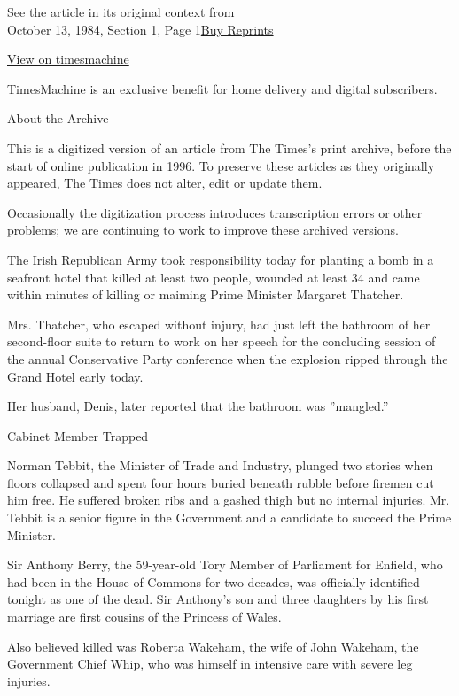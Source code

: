 See the article in its original context from\\
October 13, 1984, Section 1, Page
1\href{https://store.nytimes.com/collections/new-york-times-page-reprints?utm_source=nytimes\&utm_medium=article-page\&utm_campaign=reprints}{Buy
Reprints}

\href{http://timesmachine.nytimes.com/timesmachine/1984/10/13/008333.html}{View
on timesmachine}

TimesMachine is an exclusive benefit for home delivery and digital
subscribers.

About the Archive

This is a digitized version of an article from The Times's print
archive, before the start of online publication in 1996. To preserve
these articles as they originally appeared, The Times does not alter,
edit or update them.

Occasionally the digitization process introduces transcription errors or
other problems; we are continuing to work to improve these archived
versions.

The Irish Republican Army took responsibility today for planting a bomb
in a seafront hotel that killed at least two people, wounded at least 34
and came within minutes of killing or maiming Prime Minister Margaret
Thatcher.

Mrs. Thatcher, who escaped without injury, had just left the bathroom of
her second-floor suite to return to work on her speech for the
concluding session of the annual Conservative Party conference when the
explosion ripped through the Grand Hotel early today.

Her husband, Denis, later reported that the bathroom was ''mangled.''

Cabinet Member Trapped

Norman Tebbit, the Minister of Trade and Industry, plunged two stories
when floors collapsed and spent four hours buried beneath rubble before
firemen cut him free. He suffered broken ribs and a gashed thigh but no
internal injuries. Mr. Tebbit is a senior figure in the Government and a
candidate to succeed the Prime Minister.

Sir Anthony Berry, the 59-year-old Tory Member of Parliament for
Enfield, who had been in the House of Commons for two decades, was
officially identified tonight as one of the dead. Sir Anthony's son and
three daughters by his first marriage are first cousins of the Princess
of Wales.

Also believed killed was Roberta Wakeham, the wife of John Wakeham, the
Government Chief Whip, who was himself in intensive care with severe leg
injuries.

